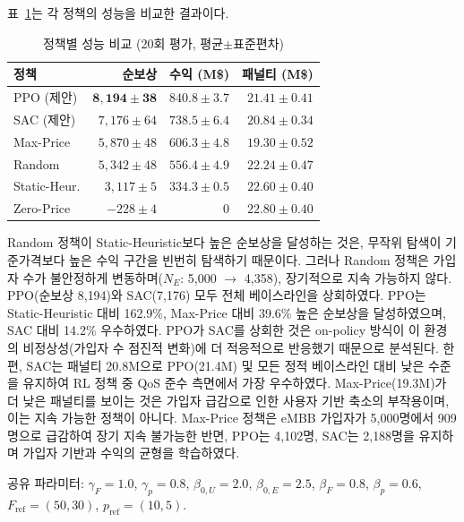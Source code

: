 \documentclass[10pt, twocolumn]{article}
\begin{document}
표~\ref{tab:results}는 각 정책의 성능을 비교한 결과이다.

\begin{table}[h]
\centering
\caption{정책별 성능 비교 (20회 평가, 평균$\pm$표준편차)}
\label{tab:results}
\scriptsize
\begin{tabular}{@{}lrrr@{}}
\toprule
정책 & 순보상\footnotemark & 수익 (M\$) & 패널티 (M\$) \\
\midrule
PPO (제안) & $\mathbf{8{,}194 \pm 38}$ & $\mathbf{840.8 \pm 3.7}$ & $21.41 \pm 0.41$ \\
SAC (제안) & $7{,}176 \pm 64$ & $738.5 \pm 6.4$ & $\mathbf{20.84 \pm 0.34}$ \\
Max-Price & $5{,}870 \pm 48$ & $606.3 \pm 4.8$ & $19.30 \pm 0.52$ \\
Random & $5{,}342 \pm 48$ & $556.4 \pm 4.9$ & $22.24 \pm 0.47$ \\
Static-Heur. & $3{,}117 \pm 5$ & $334.3 \pm 0.5$ & $22.60 \pm 0.40$ \\
Zero-Price & $-228 \pm 4$ & $0$ & $22.80 \pm 0.40$ \\
\bottomrule
\end{tabular}
\end{table}

Random 정책이 Static-Heuristic보다 높은 순보상을 달성하는 것은, 무작위 탐색이 기준가격보다 높은 수익 구간을 빈번히 탐색하기 때문이다. 그러나 Random 정책은 가입자 수가 불안정하게 변동하며($N_E$: 5{,}000 $\rightarrow$ 4{,}358), 장기적으로 지속 가능하지 않다.
PPO(순보상 8{,}194)와 SAC(7{,}176) 모두 전체 베이스라인을 상회하였다.
PPO는 Static-Heuristic 대비 162.9\%, Max-Price 대비 39.6\% 높은 순보상을 달성하였으며, SAC 대비 14.2\% 우수하였다.
PPO가 SAC를 상회한 것은 on-policy 방식이 이 환경의 비정상성(가입자 수 점진적 변화)에 더 적응적으로 반응했기 때문으로 분석된다.
한편, SAC는 패널티 20.8M으로 PPO(21.4M) 및 모든 정적 베이스라인 대비 낮은 수준을 유지하여 RL 정책 중 QoS 준수 측면에서 가장 우수하였다. Max-Price(19.3M)가 더 낮은 패널티를 보이는 것은 가입자 급감으로 인한 사용자 기반 축소의 부작용이며, 이는 지속 가능한 정책이 아니다.
Max-Price 정책은 eMBB 가입자가 5{,}000명에서 909명으로 급감하여 장기 지속 불가능한 반면, PPO는 4{,}102명, SAC는 2{,}188명을 유지하며 가입자 기반과 수익의 균형을 학습하였다.

공유 파라미터: $\gamma_F = 1.0$, $\gamma_p = 0.8$, $\beta_{0,U} = 2.0$, $\beta_{0,E} = 2.5$, $\beta_F = 0.8$, $\beta_p = 0.6$, $F_{\text{ref}} = (50, 30)$, $p_{\text{ref}} = (10, 5)$.
\end{document}
